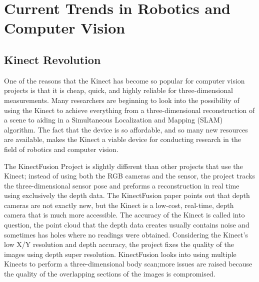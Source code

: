 \documentclass[pdftex,10.5pt]{report}
\begin{document}
\section{Current Trends in Robotics and Computer Vision}

\subsection{Kinect Revolution}
One of the reasons that the Kinect has become so popular for computer vision projects is that it is cheap, quick, and highly reliable for three-dimensional measurements. Many researchers are beginning to look into the possibility of using the Kinect to achieve everything from a three-dimensional reconstruction of a scene to aiding in a Simultaneous Localization and Mapping (SLAM) algorithm. The fact that the device is so affordable, and so many new resources are available, makes the Kinect a viable device for conducting research in the field of robotics and computer vision.

The KinectFusion Project is slightly different than other projects that use the Kinect; instead of using both the RGB cameras and the sensor, the project tracks the three-dimensional sensor pose and preforms a reconstruction in real time using exclusively the depth data. The KinectFusion paper points out that depth cameras are not exactly new, but the Kinect is a low-cost, real-time, depth camera that is much more accessible. The accuracy of the Kinect is called into question, the point cloud that the depth data creates usually contains noise and sometimes has holes where no readings were obtained. Considering the Kinect's low X/Y resolution and depth accuracy, the project fixes the quality of the images using depth super resolution. KinectFusion looks into using multiple Kinects to perform a three-dimensional body scan;more issues are raised because the quality of the overlapping sections of the images is compromised.
\end{document}
